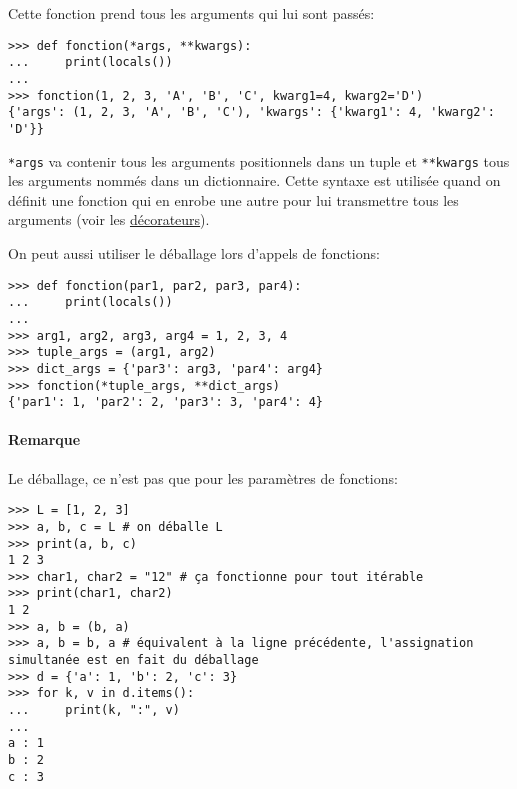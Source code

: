 Cette fonction prend tous les arguments qui lui sont passés:
\begin{verbatim}
>>> def fonction(*args, **kwargs):
...     print(locals())
...
>>> fonction(1, 2, 3, 'A', 'B', 'C', kwarg1=4, kwarg2='D')
{'args': (1, 2, 3, 'A', 'B', 'C'), 'kwargs': {'kwarg1': 4, 'kwarg2': 'D'}}
\end{verbatim}

\texttt{*args} va contenir tous les arguments positionnels dans un tuple et \texttt{**kwargs}
tous les arguments nommés dans un dictionnaire. Cette syntaxe est utilisée quand on définit une fonction qui en enrobe une
autre pour lui transmettre tous les arguments (voir les \hyperref[sec:decorateur]{décorateurs}).\medskip

On peut aussi utiliser le déballage lors d'appels de fonctions:
\begin{verbatim}
>>> def fonction(par1, par2, par3, par4):
...     print(locals())
...
>>> arg1, arg2, arg3, arg4 = 1, 2, 3, 4
>>> tuple_args = (arg1, arg2)
>>> dict_args = {'par3': arg3, 'par4': arg4}
>>> fonction(*tuple_args, **dict_args)
{'par1': 1, 'par2': 2, 'par3': 3, 'par4': 4}
\end{verbatim}

\paragraph*{Remarque} Le déballage, ce n'est pas que pour les paramètres de fonctions:
\begin{verbatim}
>>> L = [1, 2, 3]
>>> a, b, c = L # on déballe L
>>> print(a, b, c)
1 2 3
>>> char1, char2 = "12" # ça fonctionne pour tout itérable
>>> print(char1, char2)
1 2
>>> a, b = (b, a)
>>> a, b = b, a # équivalent à la ligne précédente, l'assignation simultanée est en fait du déballage
>>> d = {'a': 1, 'b': 2, 'c': 3}
>>> for k, v in d.items():
...     print(k, ":", v)
... 
a : 1
b : 2
c : 3
\end{verbatim}

